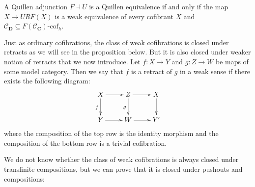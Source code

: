\documentclass{tac}
\theoremstyle{definition}
\newcommand{\cof}{\mathcal{C}}
\newcommand{\cat}[1]{\mathbf{#1}}
\newcommand{\C}{\cat{C}}
\newcommand{\D}{\cat{D}}
\newcommand{\I}{\mathrm{I}}
\newcommand{\class}[2]{#1\text{-}\mathrm{#2}}
\newcommand{\Icof}[1][\I]{\class{#1}{cof}}
\begin{document}
\begin{cor}
A Quillen adjunction $F \dashv U$ is a Quillen equivalence if and only if the map $X \to URF(X)$ is a weak equivalence of every cofibrant $X$ and $\cof_\D \subseteq \Icof[F(\cof_\C)]_h$.
\end{cor}

Just as ordinary cofibrations, the class of weak cofibrations is closed under retracts as we will see in the proposition below.
But it is also closed under weaker notion of retracts that we now introduce.
Let $f : X \to Y$ and $g : Z \to W$ be maps of some model category.
Then we say that $f$ is a retract of $g$ in a weak sense if there exists the following diagram:
\[ \xymatrix{ X \ar[r] \ar[d]_f & Z \ar[r] \ar[d]_g & X \ar[d] \\
              Y \ar[r]          & W \ar[r]          & Y'
            } \]
where the composition of the top row is the identity morphism and the composition of the bottom row is a trivial cofibration.

We do not know whether the class of weak cofibrations is always closed under transfinite compositions, but we can prove that it is closed under pushouts and compositions:
\end{document}
